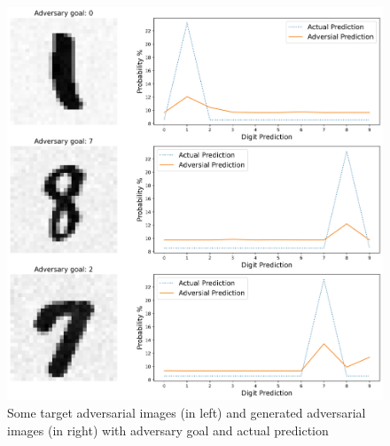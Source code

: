         \begin{figure}[htbp]
            \centering
            \includegraphics[width=\linewidth]{images/generated_adversarial_images_unsuccessful.jpg}
            \caption{Some target adversarial images (in left) and generated adversarial images (in right) with adversary goal and actual prediction}
            \label{fig:adversarial_images_unsuccessful}
        \end{figure}

    